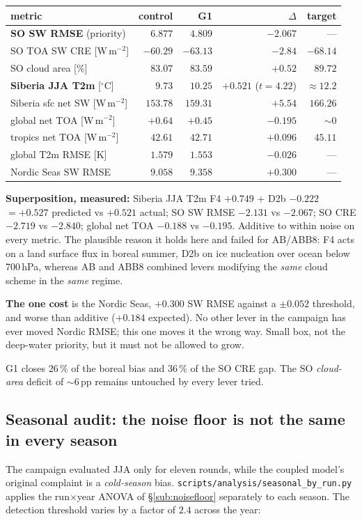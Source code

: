 \documentclass[10pt]{article}
\begin{document}
\begin{center}\footnotesize
\begin{tabular}{l r r r r}
\toprule
metric & control & G1 & $\Delta$ & target \\
\midrule
\textbf{SO SW RMSE} (priority) & $6.877$ & $\mathbf{4.809}$ & $-2.067$ & --- \\
SO TOA SW CRE [W\,m$^{-2}$] & $-60.29$ & $-63.13$ & $-2.84$ & $-68.14$ \\
SO cloud area [\%] & $83.07$ & $83.59$ & $+0.52$ & $89.72$ \\
\textbf{Siberia JJA T2m} [$^\circ$C] & $9.73$ & $\mathbf{10.25}$ & $\mathbf{+0.521}$ ($t{=}4.22$) & $\approx 12.2$ \\
Siberia sfc net SW [W\,m$^{-2}$] & $153.78$ & $159.31$ & $+5.54$ & $166.26$ \\
global net TOA [W\,m$^{-2}$] & $+0.64$ & $+0.45$ & $-0.195$ & $\sim 0$ \\
tropics net TOA [W\,m$^{-2}$] & $42.61$ & $42.71$ & $+0.096$ & $45.11$ \\
global T2m RMSE [K] & $1.579$ & $1.553$ & $-0.026$ & --- \\
Nordic Seas SW RMSE & $9.058$ & $9.358$ & $\mathbf{+0.300}$ & --- \\
\bottomrule
\end{tabular}
\end{center}

\noindent\textbf{Superposition, measured:} Siberia JJA T2m F4 $+0.749$ $+$ D2b $-0.222$
$=+0.527$ predicted vs $\mathbf{+0.521}$ actual; SO SW RMSE $-2.131$ vs $-2.067$; SO CRE
$-2.719$ vs $-2.840$; global net TOA $-0.188$ vs $-0.195$. Additive to within noise on every
metric. The plausible reason it holds here and failed for AB/ABB8: F4 acts on a land surface
flux in boreal summer, D2b on ice nucleation over ocean below 700\,hPa, whereas AB and ABB8
combined levers modifying the \emph{same} cloud scheme in the \emph{same} regime.

\noindent\textbf{The one cost} is the Nordic Seas, $+0.300$ SW RMSE against a $\pm0.052$
threshold, and worse than additive ($+0.184$ expected). No other lever in the campaign has
ever moved Nordic RMSE; this one moves it the wrong way. Small box, not the deep-water
priority, but it must not be allowed to grow.

G1 closes $26\,\%$ of the boreal bias and $36\,\%$ of the SO CRE gap. The SO
\emph{cloud-area} deficit of ${\sim}6$\,pp remains untouched by every lever tried.

\subsection{Seasonal audit: the noise floor is not the same in every season}\label{sub:seasonal}
The campaign evaluated JJA only for eleven rounds, while the coupled model's original
complaint is a \emph{cold-season} bias. \texttt{scripts/analysis/seasonal\_by\_run.py} applies
the run$\times$year ANOVA of \S\ref{sub:noisefloor} separately to each season. The detection
threshold varies by a factor of $2.4$ across the year:
\end{document}
